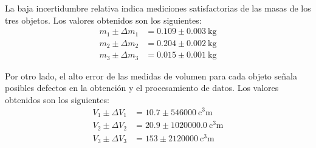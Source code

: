 \documentclass[../main.tex]{subfiles}
\begin{document}
La baja incertidumbre relativa indica mediciones satisfactorias de las masas de los tres objetos. Los valores obtenidos son los siguientes:
\begin{align*}
  m_1 \pm \Delta m_1 &= \num{0.109} \pm \qty{0.003}{\kilo\gram} \\
  m_2 \pm \Delta m_2 &= \num{0.204} \pm \qty{0.002}{\kilo\gram} \\
  m_3 \pm \Delta m_3 &= \num{0.015} \pm \qty{0.001}{\kilo\gram}
\end{align*}

Por otro lado, el alto error de las medidas de volumen para cada objeto señala posibles defectos en la obtención y el procesamiento de datos. Los valores obtenidos son los siguientes:
\begin{align*}
  V_1 \pm \Delta V_1 &= \num{10.7} \pm \qty{546000}{\cubic\centi\metre} \\
  V_2 \pm \Delta V_2 &= \num{20.9} \pm \qty{1020000.0}{\cubic\centi\metre} \\
  V_3 \pm \Delta V_3 &= \num{153} \pm \qty{2120000}{\cubic\centi\metre}
\end{align*}
\end{document}
